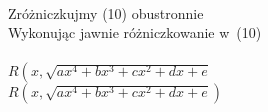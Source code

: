 \documentclass[a4paper,11pt]{article}
\numberwithin{equation}{section}
\begin{document}
\VerSpaceTwo


\noindent
{} \\
\Jest Zróżniczkujmy (10) obustronnie \\
\PowinnoByc Wykonując jawnie różniczkowanie w~(10) \\
 \\
\Jest $R\left( x, \sqrt{ a x^{ 4 } + b x^{ 3 } + c x^{ 2 } + d x + e }
\right.$ \\
\PowinnoByc $R\left( x, \sqrt{ a x^{ 4 } + b x^{ 3 } + c x^{ 2 } + d x + e }
\right)$ \\























\printbibliography





\end{document}
